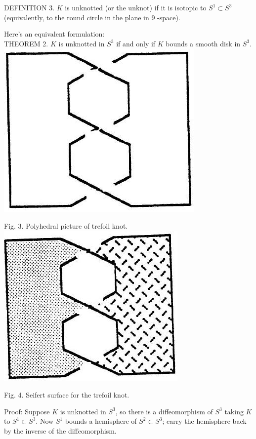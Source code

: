 \documentclass[10pt, letterpaper]{article}
\begin{document}
DEFINITION 3. $K$ is unknotted (or the unknot) if it is isotopic to $S^{1} \subset S^{3}$ (equivalently, to the round circle in the plane in 9 -space).

Here's an equivalent formulation:\\
THEOREM 2. $K$ is unknotted in $S^{3}$ if and only if $K$ bounds a smooth disk in $S^{3}$.\\
\includegraphics[scale=0.2, center]{2025_05_21_037de704f595ce642d3eg-078(1)}

Fig. 3. Polyhedral picture of trefoil knot.\\
\includegraphics[scale=0.2, center]{2025_05_21_037de704f595ce642d3eg-078}

Fig. 4. Seifert surface for the trefoil knot.

Proof: Suppose $K$ is unknotted in $S^{3}$, so there is a diffeomorphism of $S^{3}$ taking $K$ to $S^{1} \subset S^{3}$. Now $S^{1}$ bounds a hemisphere of $S^{2} \subset S^{3}$; carry the hemisphere back by the inverse of the diffeomorphism.
\end{document}
